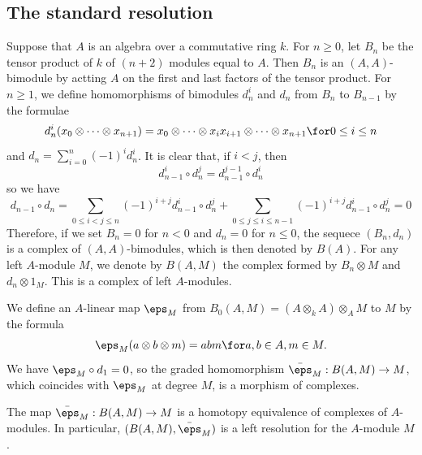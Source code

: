 \subsection{The standard resolution}
Suppose that $A$ is an algebra over a commutative ring $k$. For $n\geq 0$, let $B_n$ be the tensor product of $k$ of $(n+2)$ modules equal to $A$. Then $B_n$ is an $(A,A)$-bimodule by actting $A$ on the first and last factors of the tensor product. For $n\geq 1$, we define homomorphisms of bimodules $d_n^i$ and $d_n$ from $B_n$ to $B_{n-1}$ by the formulae
\[d_n^i(x_0\otimes\cdots\otimes x_{n+1})=x_0\otimes\cdots\otimes x_ix_{i+1}\otimes\cdots\otimes x_{n+1}\for 0\leq i\leq n\]
and $d_n=\sum_{i=0}^{n}(-1)^id_n^i$. It is clear that, if $i<j$, then
\[d_{n-1}^i\circ d_n^j=d_{n-1}^{j-1}\circ d_n^i\]
so we have
\[d_{n-1}\circ d_n=\sum_{0\leq i<j\leq n}(-1)^{i+j}d_{n-1}^i\circ d_n^j+\sum_{0\leq j\leq i\leq n-1}(-1)^{i+j}d_{n-1}^i\circ d_n^j=0\]
Therefore, if we set $B_n=0$ for $n<0$ and $d_n=0$ for $n\leq 0$, the sequece $(B_n,d_n)$ is a complex of $(A,A)$-bimodules, which is then denoted by $B(A)$. For any left $A$-module $M$, we denote by $B(A,M)$ the complex formed by $B_n\otimes M$ and $d_n\otimes 1_M$. This is a complex of left $A$-modules.\par
We define an $A$-linear map $\eps_M$ from $B_0(A,M)=(A\otimes_kA)\otimes_AM$ to $M$ by the formula
\[\eps_M(a\otimes b\otimes m)=abm\for a,b\in A,m\in M.\]
We have $\eps_M\circ d_1=0$, so the graded homomorphism $\bar{\eps}_M:B(A,M)\to M$, which coincides with $\eps_M$ at degree $M$, is a morphism of complexes.
\begin{proposition}\label{module bar complex resolution}
The map $\bar{\eps}_M:B(A,M)\to M$ is a homotopy equivalence of complexes of $A$-modules. In particular, $(B(A,M),\bar{\eps}_M)$ is a left resolution for the $A$-module $M$. 
\end{proposition}
